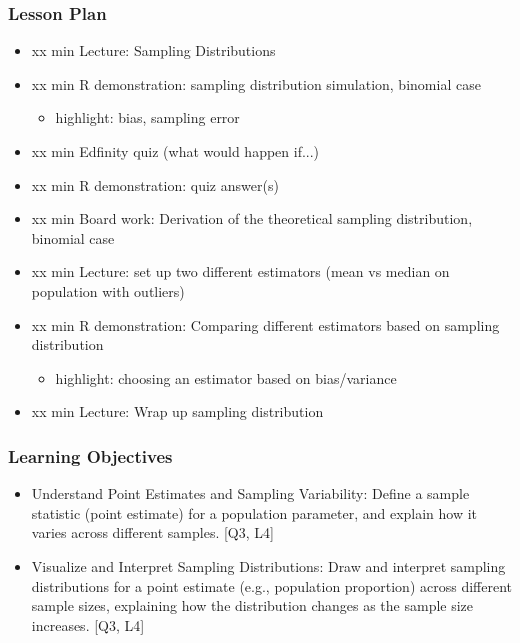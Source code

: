 

\begin{frame}
\frametitle{Lesson Plan}
\begin{itemize}
    \item xx min Lecture: Sampling Distributions
    \item xx min R demonstration: sampling distribution simulation, binomial case
    \begin{itemize}
        \item  highlight: bias, sampling error
    \end{itemize}
    \item xx min Edfinity quiz (what would happen if...)
    \item xx min R demonstration: quiz answer(s)
    \item xx min Board work: Derivation of the theoretical sampling distribution, binomial case
    \item xx min Lecture: set up two different estimators (mean vs median on population with outliers) 
    \item xx min R demonstration: Comparing different estimators based on sampling distribution 
    \begin{itemize}
        \item  highlight: choosing an estimator based on bias/variance
    \end{itemize}
    \item xx min Lecture: Wrap up sampling distribution
\end{itemize}
\end{frame}

\begin{frame}
\frametitle{Learning Objectives}
\begin{itemize}
    \item Understand Point Estimates and Sampling Variability: Define a sample statistic (point estimate) for a population parameter, and explain how it varies across different samples. [Q3, L4] 
    \item Visualize and Interpret Sampling Distributions: Draw and interpret sampling distributions for a point estimate (e.g., population proportion) across different sample sizes, explaining how the distribution changes as the sample size increases. [Q3, L4] 
\end{itemize}
\end{frame}

